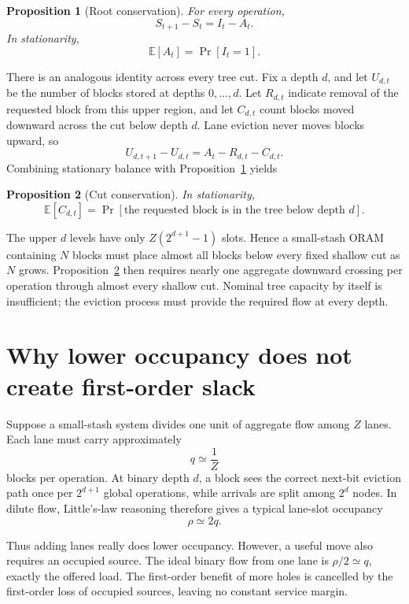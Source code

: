 \documentclass[11pt]{article}
\newtheorem{proposition}{Proposition}
\newcommand{\E}{\mathbb{E}}
\newcommand{\Prb}{\mathop{\mathrm{Pr}}}
\begin{document}
\begin{proposition}[Root conservation]
\label{prop:root}
For every operation,
\[
  S_{t+1}-S_t=I_t-A_t.
\]
In stationarity,
\[
  \E[A_t]=\Prb[I_t=1].
\]
\end{proposition}

There is an analogous identity across every tree cut.  Fix a depth $d$, and
let $U_{d,t}$ be the number of blocks stored at depths $0,\ldots,d$.  Let
$R_{d,t}$ indicate removal of the requested block from this upper region, and
let $C_{d,t}$ count blocks moved downward across the cut below depth $d$.
Lane eviction never moves blocks upward, so
\[
  U_{d,t+1}-U_{d,t}=A_t-R_{d,t}-C_{d,t}.
\]
Combining stationary balance with Proposition~\ref{prop:root} yields
\begin{proposition}[Cut conservation]
\label{prop:cut}
In stationarity,
\[
  \E[C_{d,t}]
  =\Prb[\text{the requested block is in the tree below depth }d].
\]
\end{proposition}

The upper $d$ levels have only $Z(2^{d+1}-1)$ slots.  Hence a small-stash
ORAM containing $N$ blocks must place almost all blocks below every fixed
shallow cut as $N$ grows.  Proposition~\ref{prop:cut} then requires nearly
one aggregate downward crossing per operation through almost every shallow
cut.  Nominal tree capacity by itself is insufficient; the eviction process
must provide the required flow at every depth.

\section{Why lower occupancy does not create first-order slack}

Suppose a small-stash system divides one unit of aggregate flow among $Z$
lanes.  Each lane must carry approximately
\[
  q\simeq \frac{1}{Z}
\]
blocks per operation.  At binary depth $d$, a block sees the correct next-bit
eviction path once per $2^{d+1}$ global operations, while arrivals are split
among $2^d$ nodes.  In dilute flow, Little's-law reasoning therefore gives a
typical lane-slot occupancy
\[
  \rho\simeq 2q.
\]

Thus adding lanes really does lower occupancy.  However, a useful move also
requires an occupied source.  The ideal binary flow from one lane is
$\rho/2\simeq q$, exactly the offered load.  The first-order benefit of more
holes is cancelled by the first-order loss of occupied sources, leaving no
constant service margin.
\end{document}

